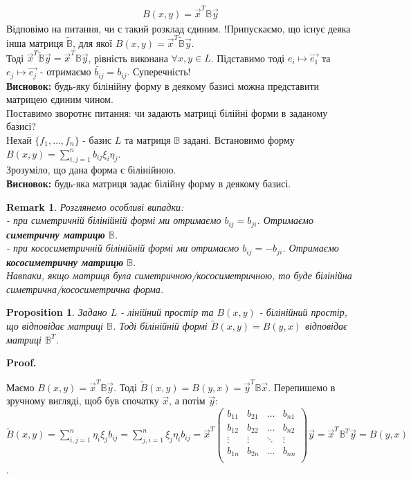 \documentclass[a4paper, 10pt]{article}
\makeatletter
\theoremstyle{theoremdd}
\newtheorem{proposition}[theorem]{Proposition}
\newtheorem{remark}[theorem]{Remark}
\renewenvironment{proof}[1][Proof.\\]{\par
\pushQED{\hfill \qed}%
\normalfont \topsep6\p@\@plus6\p@\relax
\trivlist
\item\relax
{\bfseries
#1\@addpunct{.}}\hspace\labelsep\ignorespaces
}{%
\popQED\endtrivlist\@endpefalse
}
\makeatother
\begin{document}
\begin{align*}
B(x,y) = \vec{x}^T \mathbb{B} \vec{y}
\end{align*}
Відповімо на питання, чи є такий розклад єдиним. !Припускаємо, що існує деяка інша матриця $\tilde{\mathbb{B}}$, для якої $B(x,y) = \vec{x}^T \tilde{\mathbb{B}} \vec{y}$.\\
Тоді $\vec{x}^T \tilde{\mathbb{B}} \vec{y} = \vec{x}^T \mathbb{B} \vec{y}$, рівність виконана $\forall x,y \in L$. Підставимо тоді $e_i \mapsto \vec{e_1}$ та $e_j \mapsto \vec{e_j}$ - отримаємо $\tilde{b_{ij}} = b_{ij} $. Суперечність!\\
\textbf{Висновок:} будь-яку білінійну форму в деякому базисі можна представити матрицею єдиним чином.
\bigskip \\
Поставимо зворотнє питання: чи задають матриці білійні форми в заданому базисі?\\
Нехай $\{f_1,\dots,f_n\}$ - базис $L$ та матриця $\mathbb{B}$ задані. Встановимо форму $B(x,y) = \displaystyle\sum_{i,j=1}^n b_{ij}\xi_i \eta_j$.\\
Зрозуміло, що дана форма є білінійною.\\
\textbf{Висновок:} будь-яка матриця задає білійну форму в деякому базисі.

\begin{remark}
Розглянемо особливі випадки:\\
- при симетричній білінійній формі ми отримаємо $b_{ij} = b_{ji}$. Отримаємо \textbf{симетричну матрицю} $\mathbb{B}$.\\
- при кососиметричній білінійній формі ми отримаємо $b_{ij} = -b_{ji}$. Отримаємо \textbf{кососиметричну матрицю} $\mathbb{B}$.\\
Навпаки, якщо матриця була симетричною/кососиметричною, то буде білінійна симетрична/кососиметрична форма.
\end{remark}

\begin{proposition}
Задано $L$ - лінійний простір та $B(x,y)$ - білінійний простір, що відповідає матриці $\mathbb{B}$. Тоді білінійній формі $\tilde{B}(x,y) = B(y,x)$ відповідає матриці $\mathbb{B}^T$.
\end{proposition}

\begin{proof}
Маємо $B(x,y) = \vec{x}^T \mathbb{B} \vec{y}$. Тоді $\tilde{B}(x,y) = B(y,x) = \vec{y}^T \mathbb{B} \vec{x}$. Перепишемо в зручному вигляді, щоб був спочатку $\vec{x}$, а потім $\vec{y}$:\\
$\tilde{B}(x,y) = \displaystyle\sum_{i,j=1}^n \eta_i \xi_j b_{ij} = \displaystyle\sum_{j,i=1}^n \xi_j \eta_i b_{ij} = \vec{x}^T \begin{pmatrix}
b_{11} & b_{21} & \dots & b_{n1} \\
b_{12} & b_{22} & \dots & b_{n2} \\
\vdots & \vdots & \ddots & \vdots \\
b_{1n} & b_{2n} & \dots & b_{nn} \\
\end{pmatrix} \vec{y} = \vec{x}^T \mathbb{B}^T \vec{y} = B(y,x)$.
\end{proof}
\end{document}

